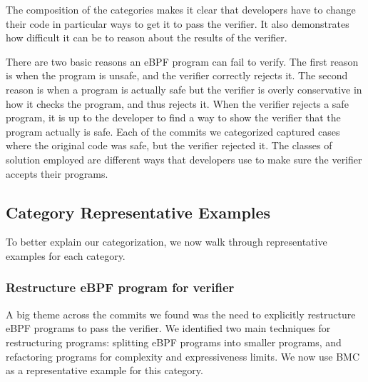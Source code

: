 
The composition of the categories makes it clear that developers have to change their code in particular ways to get it to pass the verifier.
It also demonstrates how difficult it can be to reason about the results of the verifier.

There are two basic reasons an eBPF program can fail to verify. %
The first reason is when the program is unsafe, and the verifier correctly rejects it.
The second reason is when a program is actually safe but the verifier is overly conservative
in how it checks the program, and thus rejects it.
When the verifier rejects a safe program, it is up to the developer to find a way to show the verifier that the program actually is safe.
Each of the commits we categorized captured cases where the original code was safe, but the
    verifier rejected it.
The classes of solution employed are different ways that developers use to make sure the verifier accepts their programs.

\subsection{Category Representative Examples}
To better explain our categorization, we now walk through representative examples for each category.

\subsubsection{Restructure eBPF program for verifier}
\label{motivation:restructure}
A big theme across the commits we found was the need to explicitly restructure eBPF programs to pass the verifier.
We identified two main techniques for restructuring programs: splitting eBPF programs into smaller programs, and refactoring programs for complexity and expressiveness limits.
We now use BMC\cite{BMC} as a representative example for this category.


